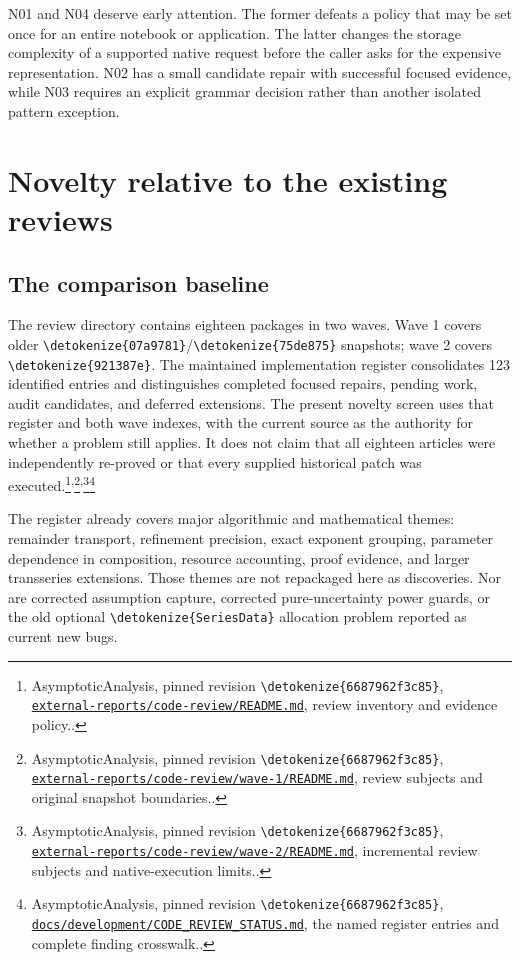 \documentclass[11pt]{article}
\newcommand{\code}[1]{{\ttfamily\expandafter\nolinkurl\expandafter{\detokenize{#1}}}}
\newcommand{\repo}{https://github.com/VladimirReshetnikov/Asymptotic/blob/6687962f3c858a4f93623cfc496f33e35c6763d4/}
\newcommand{\src}[2]{\footnote{AsymptoticAnalysis, pinned revision \code{6687962f3c85}, \href{\repo#1}{\nolinkurl{#1}}, #2.}}
\newcommand{\register}{\src{docs/development/CODE_REVIEW_STATUS.md}{the named register entries and complete finding crosswalk.}}
\begin{document}
N01 and N04 deserve early attention. The former defeats a policy that may be set once for an entire notebook or application. The latter changes the storage complexity of a supported native request before the caller asks for the expensive representation. N02 has a small candidate repair with successful focused evidence, while N03 requires an explicit grammar decision rather than another isolated pattern exception.

\section{Novelty relative to the existing reviews}

\subsection{The comparison baseline}
The review directory contains eighteen packages in two waves. Wave 1 covers older \code{07a9781}/\code{75de875} snapshots; wave 2 covers \code{921387e}. The maintained implementation register consolidates 123 identified entries and distinguishes completed focused repairs, pending work, audit candidates, and deferred extensions. The present novelty screen uses that register and both wave indexes, with the current source as the authority for whether a problem still applies. It does not claim that all eighteen articles were independently re-proved or that every supplied historical patch was executed.\src{external-reports/code-review/README.md}{review inventory and evidence policy.}\textsuperscript{,}\src{external-reports/code-review/wave-1/README.md}{review subjects and original snapshot boundaries.}\textsuperscript{,}\src{external-reports/code-review/wave-2/README.md}{incremental review subjects and native-execution limits.}\register

The register already covers major algorithmic and mathematical themes: remainder transport, refinement precision, exact exponent grouping, parameter dependence in composition, resource accounting, proof evidence, and larger transseries extensions. Those themes are not repackaged here as discoveries. Nor are corrected assumption capture, corrected pure-uncertainty power guards, or the old optional \code{SeriesData} allocation problem reported as current new bugs.
\end{document}
